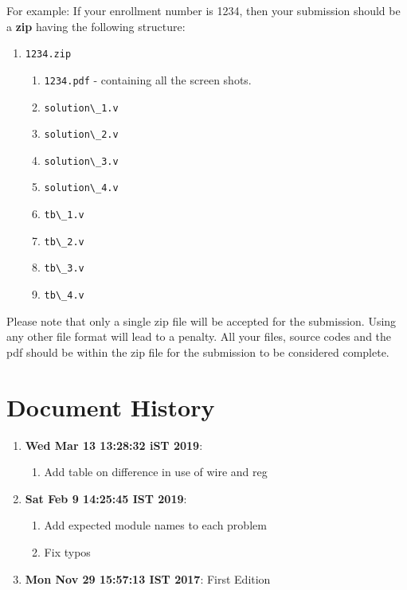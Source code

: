 \documentclass[a4paper,10pt]{article}
\theoremstyle{mytheor}
\newcommand{\inlinev}[1]{\lstinline[style=verilog-inline-style]{#1}}
\newcommand{\histitem}[2]{
  \footnotesize
  \item \textbf{#1}: #2
  \normalsize
}
\begin{document}
{\color{blue}For example}: If your enrollment number is 1234, then your
submission should be a \textbf{\color{blue}zip} having the following
structure:

\begin{enumerate}
\item \inlinev{1234.zip}
  \begin{enumerate}
  \item \inlinev{1234.pdf} - containing
    all the screen shots.
  \item \inlinev{solution\_1.v}
  \item \inlinev{solution\_2.v}
  \item \inlinev{solution\_3.v}
  \item \inlinev{solution\_4.v}
  \item \inlinev{tb\_1.v}
  \item \inlinev{tb\_2.v}
  \item \inlinev{tb\_3.v}
  \item \inlinev{tb\_4.v}
  \end{enumerate}
\end{enumerate}

Please note that only a single zip file will be accepted for the
submission. Using any other file format will lead to a
{\color{red}penalty}. All your files, source codes and the pdf should
be within the zip file for the submission to be considered complete.

\section*{Document History}
\begin{enumerate}
  \histitem{Wed Mar 13 13:28:32 iST 2019}{
    \begin{enumerate}
    \item Add table on difference in use of wire and reg
    \end{enumerate}
  }
  \histitem{Sat Feb  9 14:25:45 IST 2019}{
    \begin{enumerate}
    \item Add expected module names to each problem
    \item Fix typos
    \end{enumerate}
  }
  \histitem{Mon Nov 29 15:57:13 IST 2017} {
    First Edition
  }
\end{enumerate}
\end{document}

